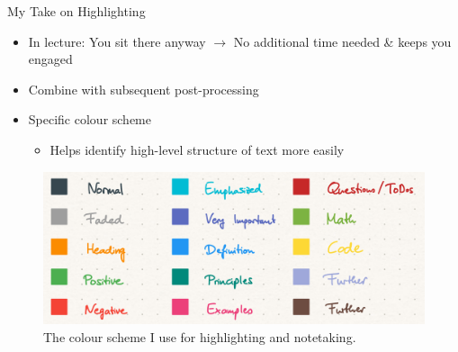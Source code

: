 \documentclass{ercisbeamer}
\begin{document}
\begin{frame}{My Take on Highlighting}
    \begin{itemize}
        \item In lecture: You sit there anyway $\rightarrow$ No additional time needed \& keeps you engaged
        \item Combine with subsequent post-processing
    	\item Specific colour scheme
        \begin{itemize}
            \item Helps identify high-level structure of text more easily
        \end{itemize}
    \end{itemize}
    \begin{figure}
        \centering
        \includegraphics[width=.6\paperwidth]{12_resources/color_scheme.png}
        \caption{The colour scheme I use for highlighting and notetaking.}
    \end{figure}
\end{frame}
\end{document}
